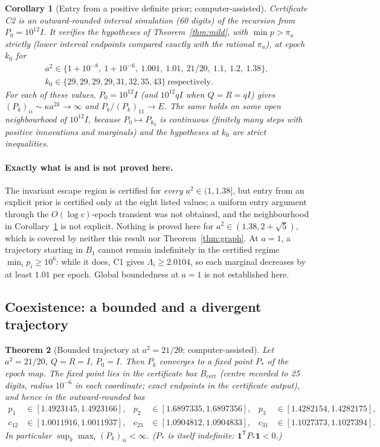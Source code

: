 \documentclass[11pt,a4paper]{article}
\numberwithin{equation}{section}
\newtheorem{theorem}{Theorem}[section]
\newtheorem{corollary}[theorem]{Corollary}
\theoremstyle{remark}\newtheorem{remark}[theorem]{Remark}
\newcommand{\T}{^{\mathsf T}}
\newcommand{\one}{\mathbf 1}
\begin{document}
\begin{corollary}[Entry from a positive definite prior; computer-assisted]\label{cor:entry}
Certificate C2 is an outward-rounded interval simulation (60 digits) of the recursion from
$P_0=10^{12}I$. It verifies the hypotheses of Theorem~\ref{thm:mild}, with $\min p>\pi_a$
strictly (lower interval endpoints compared exactly with the rational $\pi_a$), at epoch $k_0$ for
\begin{gather*}
a^2\in\{1+10^{-8},\ 1+10^{-6},\ 1.001,\ 1.01,\ 21/20,\ 1.1,\ 1.2,\ 1.38\},\\
k_0\in\{29,29,29,29,31,32,35,43\}\ \text{respectively}.
\end{gather*}
For each of these values, $P_0=10^{12}I$ (and $10^{12}qI$ when $Q=R=qI$) gives
$(P_k)_{ii}\sim\kappa a^{2k}\to\infty$ and $P_k/(P_k)_{11}\to E$. The same holds on some open
neighbourhood of $10^{12}I$, because $P_0\mapsto P_{k_0}$ is continuous (finitely many steps
with positive innovations and marginals) and the hypotheses at $k_0$ are strict inequalities.
\end{corollary}

\paragraph{Exactly what is and is not proved here.} The invariant escape region is certified for
\emph{every} $a^2\in(1,1.38]$, but entry from an explicit prior is certified only at the eight
listed values; a uniform entry argument through the $O(\log c)$-epoch transient was not
obtained, and the neighbourhood in Corollary~\ref{cor:entry} is not explicit. Nothing is
proved here for $a^2\in(1.38,2+\sqrt5)$, which is covered by neither this result nor
Theorem~\ref{thm:graph}. At $a=1$, a trajectory starting in $B_1$ cannot remain indefinitely in the certified regime
$\min_ip_i\ge10^6$: while it does, C1 gives $\Lambda_i\ge2.0104$, so each marginal decreases by at
least $1.01$ per epoch. Global boundedness at $a=1$ is not established here.

\subsection{Coexistence: a bounded and a divergent trajectory}

\begin{theorem}[Bounded trajectory at $a^2=21/20$; computer-assisted]\label{thm:coexist}
Let $a^2=21/20$, $Q=R=I$, $P_0=I$. Then $P_k$ converges to a fixed point $P_*$ of the epoch map.
The fixed point lies in the certificate box $B_{\mathrm{cert}}$ (centre recorded to 25 digits, radius $10^{-6}$ in each
coordinate; exact endpoints in the certificate output), and hence in the outward-rounded box
\[
\begin{aligned}
p_1&\in[1.4923145,1.4923166], & p_2&\in[1.6897335,1.6897356], & p_3&\in[1.4282154,1.4282175],\\
c_{12}&\in[1.0011916,1.0011937], & c_{23}&\in[1.0904812,1.0904833], & c_{31}&\in[1.1027373,1.1027394].
\end{aligned}
\]
In particular $\sup_k\max_i(P_k)_{ii}<\infty$. ($P_*$ is itself indefinite: $\one\T P_*\one<0$.)
\end{theorem}
\end{document}
